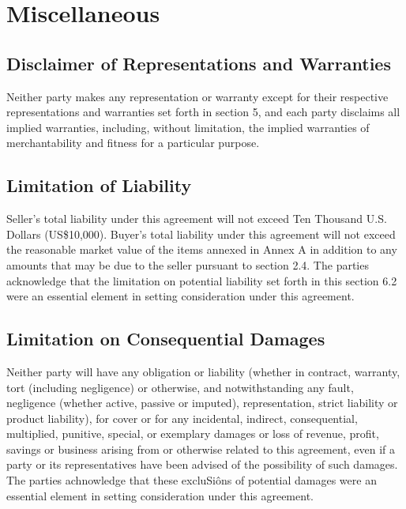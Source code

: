 \documentclass[letterpaper,10pt,english]{sphinxmanual}
\begin{document}
\section{Miscellaneous}
\label{\detokenize{7-miscellaneous:miscellaneous}}\label{\detokenize{7-miscellaneous::doc}}

\subsection{Disclaimer of Representations and Warranties}
\label{\detokenize{7-miscellaneous:disclaimer-of-representations-and-warranties}}
Neither party makes any representation or warranty except for their respective representations and warranties set forth in section 5, and each party disclaims all implied warranties, including, without limitation, the implied warranties of merchantability and fitness for a particular purpose.


\subsection{Limitation of Liability}
\label{\detokenize{7-miscellaneous:limitation-of-liability}}
Seller’s total liability under this agreement will not exceed Ten Thousand U.S. Dollars (US\$10,000). Buyer’s total liability under this agreement will not exceed the reasonable market value of the items annexed in Annex A in addition to any amounts that may be due to the seller pursuant to section 2.4. The parties acknowledge that the limitation on potential liability set forth in this section 6.2 were an essential element in setting consideration under this agreement.


\subsection{Limitation on Consequential Damages}
\label{\detokenize{7-miscellaneous:limitation-on-consequential-damages}}
Neither party will have any obligation or liability (whether in contract, warranty, tort (including negligence) or otherwise, and notwithstanding any fault, negligence (whether active, passive or imputed), representation, strict liability or product liability), for cover or for any incidental, indirect, consequential, multiplied, punitive, special, or exemplary damages or loss of revenue, profit, savings or business arising from or otherwise related to this agreement, even if a party or its representatives have been advised of the possibility of such damages. The parties achnowledge that these excluSiôns of potential damages were an essential element in setting consideration under this agreement.
\end{document}
